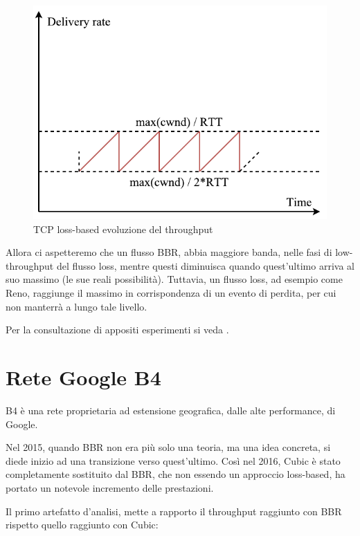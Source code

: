 \begin{figure}[H]

\center
\caption{TCP loss-based evoluzione del throughput}
\includegraphics[scale=0.8]{chapters/application/img/tcp_reno}

\end{figure}

Allora ci aspetteremo che un flusso BBR, abbia maggiore banda, nelle fasi di low-throughput del flusso loss, mentre questi diminuisca quando quest'ultimo arriva al suo massimo (le sue reali possibilità). Tuttavia, un flusso loss, ad esempio come Reno, raggiunge il massimo in corrispondenza di un evento di perdita, per cui non manterrà a lungo tale livello. \bigskip

Per la consultazione di appositi esperimenti si veda \cite{ietf:ietf-98-bbr-slides}. 

\section{Rete Google B4}

B4 è una rete proprietaria ad estensione geografica, dalle alte performance, di Google. \bigskip

Nel 2015, quando BBR non era più solo una teoria, ma una idea concreta, si diede inizio ad una transizione verso quest'ultimo. Così nel 2016, Cubic è stato completamente sostituito dal BBR, che non essendo un approccio loss-based, ha portato un notevole incremento delle prestazioni. \bigskip

Il primo artefatto d'analisi, mette a rapporto il throughput raggiunto con BBR rispetto quello raggiunto con Cubic:

